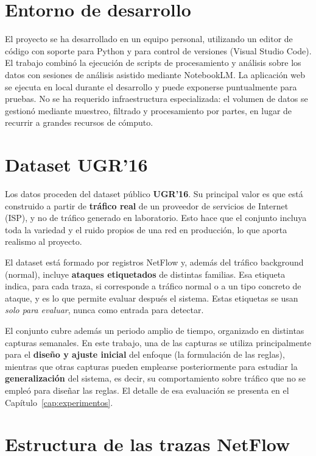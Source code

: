 \section{Entorno de desarrollo}
\label{sec:herr_entorno}

El proyecto se ha desarrollado en un equipo personal, utilizando un editor de código con soporte para Python y para control de versiones (Visual Studio Code). El trabajo combinó la ejecución de scripts de procesamiento y análisis sobre los datos con sesiones de análisis asistido mediante NotebookLM. La aplicación web se ejecuta en local durante el desarrollo y puede exponerse puntualmente para pruebas. No se ha requerido infraestructura especializada: el volumen de datos se gestionó mediante muestreo, filtrado y procesamiento por partes, en lugar de recurrir a grandes recursos de cómputo.

\section{Dataset UGR'16}
\label{sec:herr_ugr16}

Los datos proceden del dataset público \textbf{UGR'16}. Su principal valor es que está construido a partir de \textbf{tráfico real} de un proveedor de servicios de Internet (ISP), y no de tráfico generado en laboratorio. Esto hace que el conjunto incluya toda la variedad y el ruido propios de una red en producción, lo que aporta realismo al proyecto.

El dataset está formado por registros NetFlow y, además del tráfico background (normal), incluye \textbf{ataques etiquetados} de distintas familias. Esa etiqueta indica, para cada traza, si corresponde a tráfico normal o a un tipo concreto de ataque, y es lo que permite evaluar después el sistema. Estas etiquetas se usan \emph{solo para evaluar}, nunca como entrada para detectar.

El conjunto cubre además un periodo amplio de tiempo, organizado en distintas capturas semanales. En este trabajo, una de las capturas se utiliza principalmente para el \textbf{diseño y ajuste inicial} del enfoque (la formulación de las reglas), mientras que otras capturas pueden emplearse posteriormente para estudiar la \textbf{generalización} del sistema, es decir, su comportamiento sobre tráfico que no se empleó para diseñar las reglas. El detalle de esa evaluación se presenta en el Capítulo~\ref{cap:experimentos}.

\section{Estructura de las trazas NetFlow}
\label{sec:herr_netflow}


